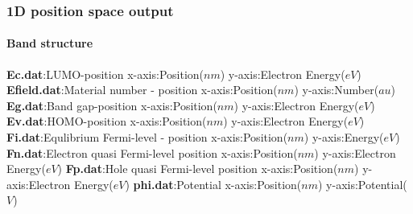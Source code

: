 \subsubsection{1D position space output}
\paragraph{Band structure}
\textbf{Ec.dat}:LUMO-position\newline
x-axis:Position($nm$)\newline
y-axis:Electron Energy($eV$)\newline
\newline
\textbf{Efield.dat}:Material number - position\newline
x-axis:Position($nm$)\newline
y-axis:Number($au$)\newline
\newline
\textbf{Eg.dat}:Band gap-position\newline
x-axis:Position($nm$)\newline
y-axis:Electron Energy($eV$)\newline
\newline
\textbf{Ev.dat}:HOMO-position\newline
x-axis:Position($nm$)\newline
y-axis:Electron Energy($eV$)\newline
\newline
\textbf{Fi.dat}:Equlibrium Fermi-level - position\newline
x-axis:Position($nm$)\newline
y-axis:Energy($eV$)\newline
\newline
\textbf{Fn.dat}:Electron quasi Fermi-level position\newline
x-axis:Position($nm$)\newline
y-axis:Electron Energy($eV$)\newline
\newline
\textbf{Fp.dat}:Hole quasi Fermi-level position\newline
x-axis:Position($nm$)\newline
y-axis:Electron Energy($eV$)\newline
\newline
\textbf{phi.dat}:Potential\newline
x-axis:Position($nm$)\newline
y-axis:Potential($V$)\newline
\newline
